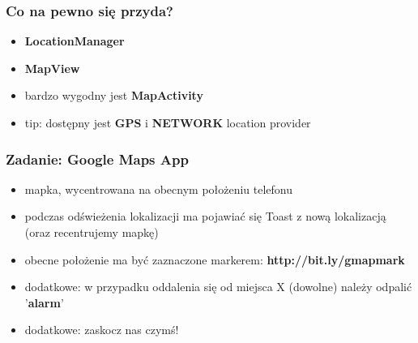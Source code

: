 \documentclass{beamer}
\begin{document}
\begin{frame}\frametitle{Co na pewno się przyda?}
\begin{itemize}
 \item \textbf{LocationManager}
 \item \textbf{MapView}
 \item bardzo wygodny jest \textbf{MapActivity}
 \item tip: dostępny jest \textbf{GPS} i \textbf{NETWORK} location provider
\end{itemize}
\end{frame}
 
\begin{frame}[fragile]\frametitle{Zadanie: Google Maps App}
\begin{itemize}
 \item mapka, wycentrowana na obecnym położeniu telefonu
 \item podczas odświeżenia lokalizacji ma pojawiać się Toast z nową lokalizacją (oraz recentrujemy mapkę)
 \item obecne położenie ma być zaznaczone markerem: \textbf{http://bit.ly/gmapmark}
 \item dodatkowe: w przypadku oddalenia się od miejsca X (dowolne) należy odpalić '\textbf{alarm}'
 \item dodatkowe: zaskocz nas czymś!
\end{itemize}
\end{frame}
\end{document}
